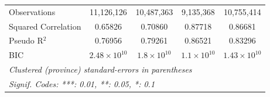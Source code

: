 \begin{table}[htbp]
\begin{tabular}{lcccc}
      Observations                                 & 11,126,126            & 10,487,363           & 9,135,368            & 10,755,414\\  
      Squared Correlation                          & 0.65826               & 0.70860              & 0.87718              & 0.86681\\  
      Pseudo R$^2$                                 & 0.76956               & 0.79261              & 0.86521              & 0.83296\\  
      BIC                                          & $2.48\times 10^{10}$  & $1.8\times 10^{10}$  & $1.1\times 10^{10}$  & $1.43\times 10^{10}$\\   
      \midrule \midrule
      \multicolumn{5}{l}{\emph{Clustered (province) standard-errors in parentheses}}\\
      \multicolumn{5}{l}{\emph{Signif. Codes: ***: 0.01, **: 0.05, *: 0.1}}\\
   \end{tabular}
\end{table}



